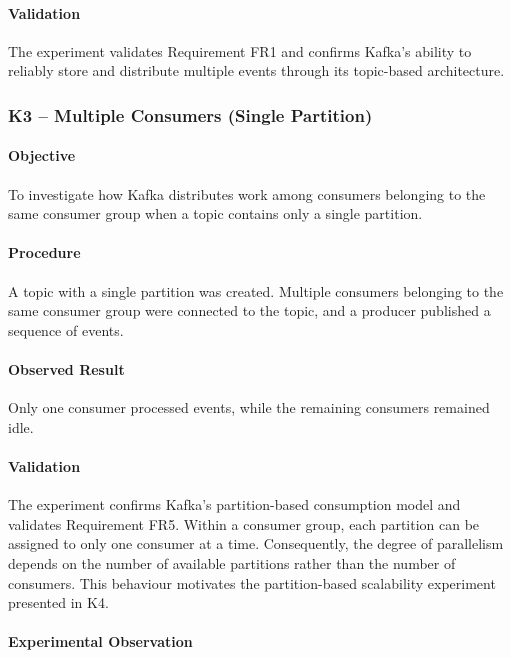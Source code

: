 \documentclass{scrartcl}
\begin{document}
\paragraph{Validation}

The experiment validates Requirement FR1 and confirms Kafka's ability to reliably store and distribute multiple events through its topic-based architecture.

\subsubsection{K3 -- Multiple Consumers (Single Partition)}

\paragraph{Objective}

To investigate how Kafka distributes work among consumers belonging to the same consumer group when a topic contains only a single partition.

\paragraph{Procedure}

A topic with a single partition was created. Multiple consumers belonging to the same consumer group were connected to the topic, and a producer published a sequence of events.

\paragraph{Observed Result}

Only one consumer processed events, while the remaining consumers remained idle.

\paragraph{Validation}

The experiment confirms Kafka's partition-based consumption model and validates Requirement FR5. Within a consumer group, each partition can be assigned to only one consumer at a time. Consequently, the degree of parallelism depends on the number of available partitions rather than the number of consumers. This behaviour motivates the partition-based scalability experiment presented in K4.

\paragraph{Experimental Observation}
\end{document}

